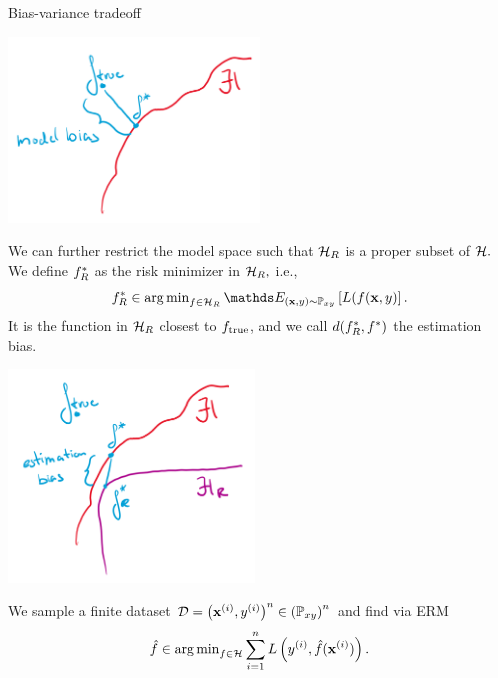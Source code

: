 \documentclass[11pt,compress,t,notes=noshow, xcolor=table]{beamer}
\begin{document}
\begin{vbframe}{Bias-variance tradeoff}
\begin{center}
\includegraphics[width=0.5\textwidth]{slides/regularization/figure_man/to_replace_model_bias.png}
\end{center}
\framebreak 
We can further restrict the model space such that $\mathcal{H}_R$ is a proper subset of $\mathcal{H}.$
We define $f^{\ast}_R$ as the risk minimizer in $\mathcal{H}_R,$ i.e.,
$$\fbayes_R \in \argmin_{f \in \Hspace_R} \E_{\xy \sim \Pxy}\left[L(f(\xv, y)\right].$$
It is the function in $\mathcal{H}_R$ closest to $f_{\text{true}}$, and we call $d(f^{\ast}_R, f^{\ast})$ the estimation bias.
\begin{center}
\includegraphics[width=0.49\textwidth]{slides/regularization/figure_man/to_replace_estimation_bias.png}
\end{center}
\framebreak

We sample a finite dataset $\mathcal{D} = \left(\mathbf{x}^{(i)}, y^{(i)}\right)^n \in \left(\mathbb{P}_{xy}\right)^n$ and find via ERM
$$\hat{f} \in \operatorname{arg\,min}_{f\in\mathcal{H}} \sum\limits_{i=1}^n L\left(y^{(i)}, \hat{f} (\mathbf{x}^{(i)})\right).$$

\begin{columns}[onlytextwidth,T]


\end{columns}
\end{vbframe}
\end{document}
